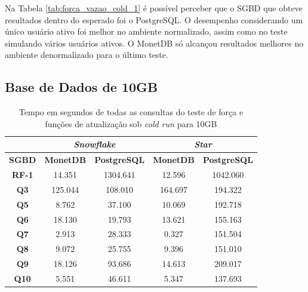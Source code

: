 Na Tabela \ref{tab:forca_vazao_cold_1} é possível perceber que o SGBD que obteve resultados dentro do esperado foi o PostgreSQL. O desempenho considerando um único usuário ativo foi melhor no ambiente normalizado, assim como no teste simulando vários usuários ativos. O MonetDB só alcançou resultados melhores no ambiente denormalizado para o último teste.



\subsection{Base de Dados de 10GB}

\begin{table}[htpb]
        \centering
        \caption{Tempo em segundos de todas as consultas do teste de força e funções de atualização sob \textit{cold run} para 10GB}
        \label{tab:queries_cold_10}
        \begin{tabular}{|c|c|c|c|c|}
        \hline
                & \multicolumn{2}{c|}{\textit{\textbf{Snowflake}}} & \multicolumn{2}{c|}{\textit{\textbf{Star}}} \\ \hline
        \textbf{SGBD}  & \textbf{MonetDB}      & \textbf{PostgreSQL}      & \textbf{MonetDB}    & \textbf{PostgreSQL}   \\ \hline
        \textbf{RF-1}  & 14.351                & 1304.641                 & 12.596              & 1042.060              \\ \hline
        \textbf{Q3}    & 125.044               & 108.010                  & 164.697             & 194.322               \\ \hline
        \textbf{Q5}    & 8.762                 & 37.100                   & 10.069              & 192.718               \\ \hline
        \textbf{Q6}    & 18.130                & 19.793                   & 13.621              & 155.163               \\ \hline
        \textbf{Q7}    & 2.913                 & 28.333                   & 0.327               & 151.504               \\ \hline
        \textbf{Q8}    & 9.072                 & 25.755                   & 9.396               & 151.010               \\ \hline
        \textbf{Q9}    & 18.126                & 93.686                   & 14.613              & 209.017               \\ \hline
        \textbf{Q10}   & 5.551                 & 46.611                   & 5.347               & 137.693               \\ \hline

\end{tabular}
\end{table}
